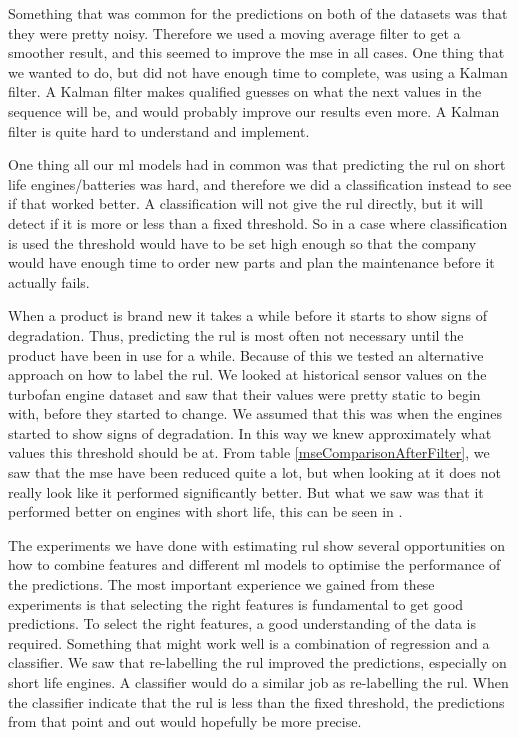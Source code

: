 \documentclass[english, a4paper]{report}
\begin{document}
{{        \par 
        Something that was common for the predictions on both of the datasets was that they were pretty noisy. Therefore we used a moving average filter to get a smoother result, and this seemed to improve the \gls{mse} in all cases. One thing that we wanted to do, but did not have enough time to complete, was using a Kalman filter. A Kalman filter makes qualified guesses on what the next values in the sequence will be, and would probably improve our results even more. A Kalman filter is quite hard to understand and implement. 
        \par 
        One thing all our \gls{ml} models had in common was that predicting the \gls{rul} on short life engines/batteries was hard, and therefore we did a classification instead to see if that worked better. A classification will not give the \gls{rul} directly, but it will detect if it is more or less than a fixed threshold. So in a case where classification is used the threshold would have to be set high enough so that the company would have enough time to order new parts and plan the maintenance before it actually fails. 
        \par 
        When a product is brand new it takes a while before it starts to show signs of degradation. Thus, predicting the \gls{rul} is most often not necessary until the product have been in use for a while. Because of this we tested an alternative approach on how to label the \gls{rul}. We looked at historical sensor values on the turbofan engine dataset and saw that their values were pretty static to begin with, before they started to change. We assumed that this was when the engines started to show signs of degradation. In this way we knew approximately what values this threshold should be at. From table \ref{mseComparisonAfterFilter}, we saw that the \gls{mse} have been reduced quite a lot, but when looking at  it does not really look like it performed significantly better. But what we saw was that it performed better on engines with short life, this can be seen in . 
        \par 
        The experiments we have done with estimating \gls{rul} show several opportunities on how to combine features and different \gls{ml} models to optimise the performance of the predictions. The most important experience we gained from these experiments is that selecting the right features is fundamental to get good predictions. To select the right features, a good understanding of the data is required. Something that might work well is a combination of regression and a classifier. We saw that re-labelling the \gls{rul} improved the predictions, especially on short life engines. A classifier would do a similar job as re-labelling the \gls{rul}. When the classifier indicate that the \gls{rul} is less than the fixed threshold, the predictions from that point and out would hopefully be more precise. 
    }
    
}
\end{document}
